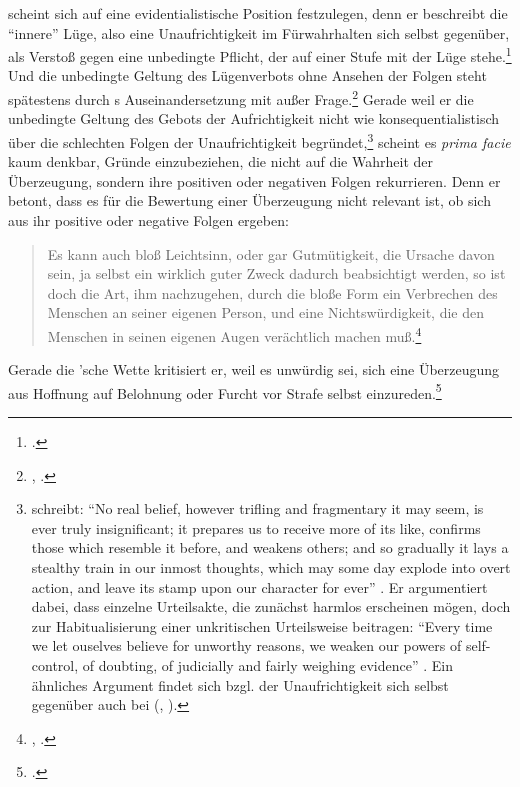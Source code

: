  scheint sich auf eine evidentialistische Position
festzulegen, denn er beschreibt die \enquote{innere} Lüge, also eine
Unaufrichtigkeit im Fürwahrhalten sich selbst gegenüber, als Verstoß gegen eine
unbedingte Pflicht, der auf einer Stufe mit der  Lüge
stehe.\footnote{\cite[Vgl.][A
85\,f.,]{Kant:DieMetaphysikderSitten1977Tugendlehre} \cite[][VI:
430.9--431.3]{Kant:GesammelteWerke1900ff.}.} Und die unbedingte Geltung des
Lügenverbots ohne Ansehen der Folgen steht spätestens durch
s Auseinandersetzung mit  außer
Frage.\footnote{\cite[Vgl.][]{Kant:UebereinvermeintesRechtausMenschenliebezuluegen1977},
\cite[][VIII: 423--430]{Kant:GesammelteWerke1900ff.}.} Gerade weil er die
unbedingte Geltung des Gebots der Aufrichtigkeit nicht wie
 konsequentialistisch über die
schlechten Folgen der Unaufrichtigkeit
begründet,\footnote{ schreibt:
\enquote{No real belief, however trifling and fragmentary it may seem, is ever
truly insignificant; it prepares us to receive more of its like, confirms those
which resemble it before, and weakens others; and so gradually it lays a
stealthy train in our inmost thoughts, which may some day explode into overt
action, and leave its stamp upon our character for ever}
\parencite[][292]{Clifford:TheEthicsofBelief1877}. Er argumentiert dabei, dass
einzelne Urteilsakte, die zunächst harmlos erscheinen mögen, doch zur
Habitualisierung einer unkritischen Urteilsweise beitragen:
\enquote{Every time we let ouselves believe for unworthy reasons, we weaken our
powers of self-control, of doubting, of judicially and fairly weighing
evidence} \parencite[][294]{Clifford:TheEthicsofBelief1877}. Ein ähnliches
Argument findet sich bzgl. der Unaufrichtigkeit sich selbst gegenüber auch bei
\mkbibparens{\cite[vgl.][A 86]{Kant:DieMetaphysikderSitten1977Tugendlehre},
\cite[][VI: 430.35--431.3]{Kant:GesammelteWerke1900ff.}}.} scheint es
\emph{prima facie} kaum denkbar, Gründe einzubeziehen, die nicht auf die
Wahrheit der Überzeugung, sondern ihre positiven oder negativen Folgen
rekurrieren. Denn er betont, dass es für die Bewertung einer Überzeugung nicht
relevant ist, ob sich aus ihr positive oder negative Folgen ergeben:
\begin{quote}
Es kann auch bloß Leichtsinn, oder gar Gutmütigkeit, die Ursache davon sein, ja
selbst ein wirklich guter Zweck dadurch beabsichtigt werden, so ist doch die
Art, ihm nachzugehen, durch die bloße Form ein Verbrechen des Menschen an seiner
eigenen Person, und eine Nichtswürdigkeit, die den Menschen in seinen eigenen
Augen verächtlich machen
muß.\footnote{\cite[][A 85]{Kant:DieMetaphysikderSitten1977Tugendlehre},
\cite[][VI: 430.4--8]{Kant:GesammelteWerke1900ff.}.}
\end{quote}
Gerade die 'sche Wette kritisiert er, weil es unwürdig sei,
sich eine Überzeugung aus Hoffnung auf Belohnung oder Furcht vor Strafe selbst
einzureden.\footnote{\cite[Vgl.][A 85\,f.,]{Kant:DieMetaphysikderSitten1977Tugendlehre}
\cite[][VI: 430.19--23]{Kant:GesammelteWerke1900ff.}.}

